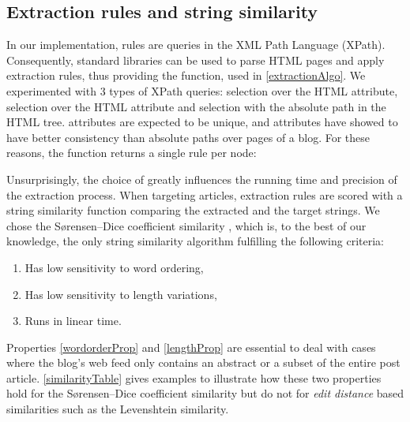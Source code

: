 \subsection{Extraction rules and string similarity}
\label{extractionrulesandstringsimilarity}

In our implementation, rules are queries in the XML Path Language (XPath). Consequently, standard libraries can be used to parse HTML pages and apply extraction rules, thus providing the  function, used in \autoref{extractionAlgo}. We experimented with 3 types of XPath queries: selection over the HTML  attribute, selection over the HTML  attribute and selection with the absolute path in the HTML tree.  attributes are expected to be unique, and  attributes have showed to have better consistency than absolute paths over pages of a blog. For these reasons, the  function returns a single rule per node:

\allrulesAlgo

Unsurprisingly, the choice of  greatly influences the running time and precision of the extraction process. When targeting articles, extraction rules are scored with a string similarity function comparing the extracted and the target strings. We chose the Sørensen–Dice coefficient similarity \cite{dice1945}, which is, to the best of our knowledge, the only string similarity algorithm fulfilling the following criteria:

\begin{enumerate}
  \item\label{wordorderProp} Has low sensitivity to word ordering,
  \item\label{lengthProp} Has low sensitivity to length variations,
  \item\label{linearProp} Runs in linear time.
\end{enumerate}

Properties \ref{wordorderProp} and \ref{lengthProp} are essential to deal with cases where the blog's web feed only contains an abstract or a subset of the entire post article. \autoref{similarityTable} gives examples to illustrate how these two properties hold for the Sørensen–Dice coefficient similarity but do not for \emph{edit distance} based similarities such as the Levenshtein \cite{levenshtein1966} similarity.

\similarityTable

